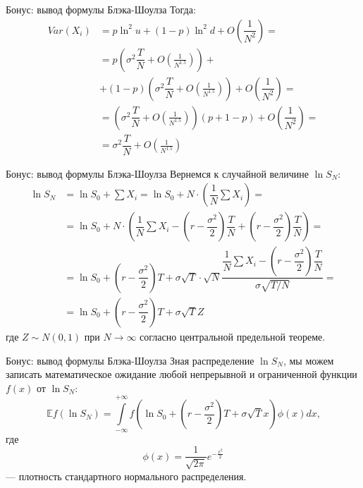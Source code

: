 \documentclass[pdf,12pt]{beamer}
\begin{document}
\begin{frame}{Бонус: вывод формулы Блэка-Шоулза}
Тогда:
\begin{align*}
Var(X_i) &= p\ln^2u + (1-p)\ln^2d + O\left(\dfrac{1}{N^2}\right) = \\
&= p\left(\sigma^2\dfrac{T}{N} + O\left(\frac{1}{N^{1.5}}\right)\right) + \\ 
&+ (1-p)\left(\sigma^2\dfrac{T}{N} + O\left(\frac{1}{N^{1.5}}\right)\right)
+  O\left(\dfrac{1}{N^2}\right) = \\
& = \left(\sigma^2\dfrac{T}{N} + O\left(\frac{1}{N^{1.5}}\right)\right)
\left( p + 1 - p\right) + O\left(\dfrac{1}{N^2}\right) = \\
&= \sigma^2\dfrac{T}{N} + O\left(\frac{1}{N^{1.5}}\right)
\end{align*}
\end{frame}

\begin{frame}{Бонус: вывод формулы Блэка-Шоулза}
Вернемся к случайной величине $\ln S_N$:
\begin{align*}
\ln S_N &= \ln S_0 + \sum X_i 
= \ln S_0 + N \cdot \left( \dfrac{1}{N}\sum X_i \right) = \\
&= \ln S_0 + N \cdot \left( \dfrac{1}{N}\sum X_i - \left(r - \dfrac{\sigma^2}{2}\right)\dfrac{T}{N} + \left(r - \dfrac{\sigma^2}{2}\right)\dfrac{T}{N}\right) = \\
&= \ln S_0 +  \left(r - \dfrac{\sigma^2}{2}\right)T
+\sigma\sqrt{T} \cdot \sqrt{N}\dfrac{\dfrac{1}{N}\sum X_i - \left(r - \dfrac{\sigma^2}{2}\right)\dfrac{T}{N}}{\sigma\sqrt{T/N}} = \\
&= \ln S_0 +  \left(r - \dfrac{\sigma^2}{2}\right)T + \sigma\sqrt{T}Z
\end{align*}
\justify
где $Z\sim N(0,1)$ при $N \to \infty$ согласно центральной предельной теореме.
\end{frame}

\begin{frame}{Бонус: вывод формулы Блэка-Шоулза}
\justify
Зная распределение $\ln S_N$, мы можем записать математическое ожидание любой непрерывной и ограниченной функции $f(x)$ от $\ln S_N$:
\begin{equation*}
\mathbb{E}f(\ln S_N) = \int\limits_{-\infty}^{+\infty}f\left(\ln S_0 + \left(r-\dfrac{\sigma^2}{2}\right)T + \sigma\sqrt{T}x\right)\phi(x)dx \text{,}
\end{equation*}
где
\begin{equation*}
\phi(x) = \dfrac{1}{\sqrt{2\pi}}e^{-\frac{x^2}{2}}
\end{equation*}
--- плотность стандартного нормального распределения.
\end{frame}
\end{document}
